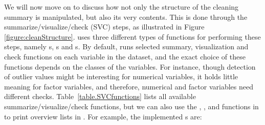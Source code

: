 \documentclass[article,shortnames]{jss}
\begin{document}
We will now move on to discuss how not only the structure of the
cleaning summary is manipulated, but also its very contents. This is
done through the summarize/visualize/check (SVC) steps, as illustrated
in Figure \ref{figure:cleanStructure}.   uses three
different types of functions for performing these steps, namely
s, s and
s.  By default,  runs selected summary,
visualization and check functions on each variable in the dataset, and
the exact choice of these functions depends on the classes of the
variables. For instance, though detection of outlier values might be
interesting for numerical variables, it holds little meaning for
factor variables, and therefore, numerical and factor variables need
different checks. Table~\ref{table.SVCfunctions} lists all available
summarize/visualize/check functions, but we can also use the
, , and
 functions in  to print overview
lists in . For example, the implemented
s are:

\end{document}
